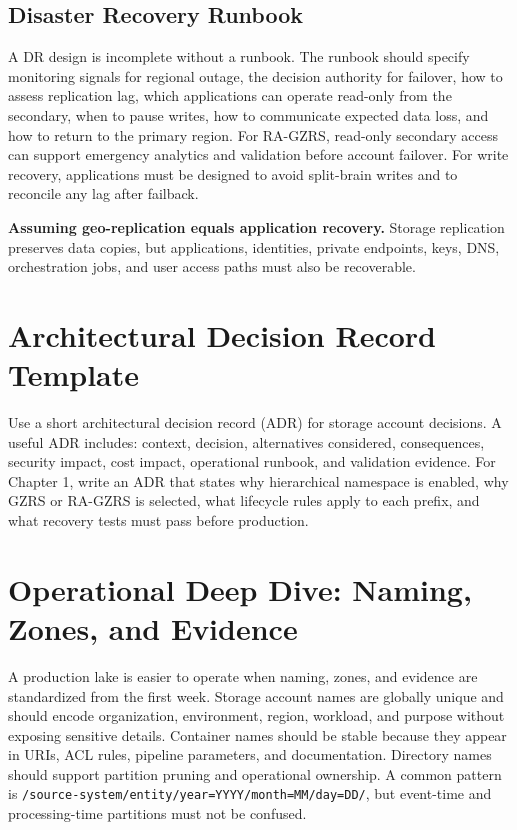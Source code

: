 \subsection{Disaster Recovery Runbook}
A DR design is incomplete without a runbook. The runbook should specify monitoring signals for regional outage, the decision authority for failover, how to assess replication lag, which applications can operate read-only from the secondary, when to pause writes, how to communicate expected data loss, and how to return to the primary region. For RA-GZRS, read-only secondary access can support emergency analytics and validation before account failover. For write recovery, applications must be designed to avoid split-brain writes and to reconcile any lag after failback.

\begin{pitfall}
\textbf{Assuming geo-replication equals application recovery.} Storage replication preserves data copies, but applications, identities, private endpoints, keys, DNS, orchestration jobs, and user access paths must also be recoverable.
\end{pitfall}

\section{Architectural Decision Record Template}
Use a short architectural decision record (ADR) for storage account decisions. A useful ADR includes: context, decision, alternatives considered, consequences, security impact, cost impact, operational runbook, and validation evidence. For Chapter 1, write an ADR that states why hierarchical namespace is enabled, why GZRS or RA-GZRS is selected, what lifecycle rules apply to each prefix, and what recovery tests must pass before production.

\section{Operational Deep Dive: Naming, Zones, and Evidence}
A production lake is easier to operate when naming, zones, and evidence are standardized from the first week. Storage account names are globally unique and should encode organization, environment, region, workload, and purpose without exposing sensitive details. Container names should be stable because they appear in URIs, ACL rules, pipeline parameters, and documentation. Directory names should support partition pruning and operational ownership. A common pattern is \texttt{/source-system/entity/year=YYYY/month=MM/day=DD/}, but event-time and processing-time partitions must not be confused.

